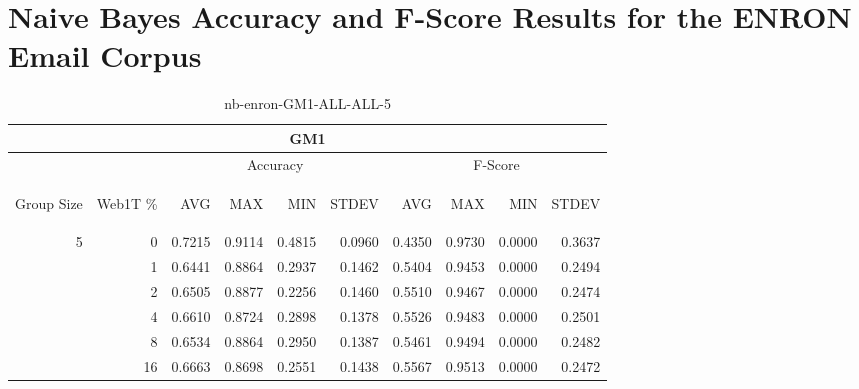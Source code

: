 \chapter{Naive Bayes Accuracy and F-Score Results for the ENRON Email Corpus}

\begin{center}
\begin{table}[htbp]
\begin{tabular}{ | r | r | r | r | r | r | r | r | r | r |}
\hline
\multicolumn{10}{|c|}{GM1}\\
\hline
 & & \multicolumn{4}{|c|}{Accuracy} & \multicolumn{4}{|c|}{F-Score}\\ \cline{3-10}
\begin{sideways}Group Size\end{sideways} & \begin{sideways}Web1T \%\end{sideways} & \begin{sideways}AVG\end{sideways} & \begin{sideways}MAX\end{sideways} & \begin{sideways}MIN\end{sideways} & \begin{sideways}STDEV\end{sideways} & \begin{sideways}AVG\end{sideways} & \begin{sideways}MAX\end{sideways} & \begin{sideways}MIN\end{sideways} & \begin{sideways}STDEV\end{sideways}\\
\hline
\multirow{5}{*}{5}
 & 0 & 0.7215 & 0.9114 & 0.4815 & 0.0960 & 0.4350 & 0.9730 & 0.0000 & 0.3637\\ \cline{2-10}
 & 1 & 0.6441 & 0.8864 & 0.2937 & 0.1462 & 0.5404 & 0.9453 & 0.0000 & 0.2494\\ \cline{2-10}
 & 2 & 0.6505 & 0.8877 & 0.2256 & 0.1460 & 0.5510 & 0.9467 & 0.0000 & 0.2474\\ \cline{2-10}
 & 4 & 0.6610 & 0.8724 & 0.2898 & 0.1378 & 0.5526 & 0.9483 & 0.0000 & 0.2501\\ \cline{2-10}
 & 8 & 0.6534 & 0.8864 & 0.2950 & 0.1387 & 0.5461 & 0.9494 & 0.0000 & 0.2482\\ \cline{2-10}
 & 16 & 0.6663 & 0.8698 & 0.2551 & 0.1438 & 0.5567 & 0.9513 & 0.0000 & 0.2472\\ \cline{2-10}
\hline
\end{tabular}
\caption{nb-enron-GM1-ALL-ALL-5}
\label{table:nb-enron-GM1-ALL-ALL-5}
\end{table}
\end{center}

